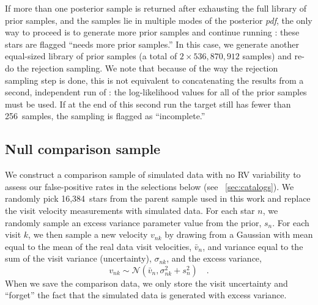 \documentclass[modern, letterpaper]{aastex62}
\newcommand{\thejoker}{\project{The~Joker}}
\newcommand{\pdf}{\textit{pdf}}
\newcommand{\nprior}{536,870,912}
\newcommand{\nposterior}{256}
\newcommand{\ncontrol}{16,384}
\begin{document}
If more than one posterior sample is returned after exhausting the full library
of prior samples, and the samples lie in multiple modes of the posterior \pdf,
the only way to proceed is to generate more prior samples and continue running
\thejoker: these stars are flagged ``needs more prior samples.''
In this case, we generate another equal-sized library of prior samples (a total
of $2\times\nprior$ samples) and re-do the rejection sampling.
We note that because of the way the rejection sampling step is done, this is not
equivalent to concatenating the results from a second, independent run of
\thejoker: the log-likelihood values for all of the prior samples must be used.
If at the end of this second run the target still has fewer than \nposterior\
samples, the sampling is flagged as ``incomplete.''

\subsection{Null comparison sample}
\label{sec:control-sample}

We construct a comparison sample of simulated data with no RV variability to
assess our false-positive rates in the selections below (see
\sectionname~\ref{sec:catalogs}).
We randomly pick \ncontrol\ stars from the parent sample used in this work and
replace the visit velocity measurements with simulated data.
For each star $n$, we randomly sample an excess variance parameter value from
the prior, $s_n$.
For each visit $k$, we then sample a new velocity $v_{nk}$ by drawing from a
Gaussian with mean equal to the mean of the real data visit velocities,
$\bar{v}_n$, and variance equal to the sum of the visit variance (uncertainty),
$\sigma_{nk}$, and the excess variance,
\begin{equation}
    v_{nk} \sim \mathcal{N}(\bar{v}_n, \sigma_{nk}^2 + s_n^2) \quad .
\end{equation}
When we save the comparison data, we only store the visit uncertainty and
``forget'' the fact that the simulated data is generated with excess variance.


%

%
\end{document}
